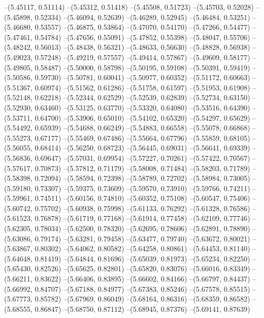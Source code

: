 --(5.45117, 0.51114)
--(5.45312, 0.51418)
--(5.45508, 0.51723)
--(5.45703, 0.52028)
--(5.45898, 0.52334)
--(5.46094, 0.52639)
--(5.46289, 0.52945)
--(5.46484, 0.53251)
--(5.46680, 0.53557)
--(5.46875, 0.53864)
--(5.47070, 0.54170)
--(5.47266, 0.54477)
--(5.47461, 0.54784)
--(5.47656, 0.55091)
--(5.47852, 0.55398)
--(5.48047, 0.55706)
--(5.48242, 0.56013)
--(5.48438, 0.56321)
--(5.48633, 0.56630)
--(5.48828, 0.56938)
--(5.49023, 0.57248)
--(5.49219, 0.57557)
--(5.49414, 0.57867)
--(5.49609, 0.58177)
--(5.49805, 0.58487)
--(5.50000, 0.58798)
--(5.50195, 0.59108)
--(5.50391, 0.59419)
--(5.50586, 0.59730)
--(5.50781, 0.60041)
--(5.50977, 0.60352)
--(5.51172, 0.60663)
--(5.51367, 0.60974)
--(5.51562, 0.61286)
--(5.51758, 0.61597)
--(5.51953, 0.61908)
--(5.52148, 0.62218)
--(5.52344, 0.62529)
--(5.52539, 0.62839)
--(5.52734, 0.63150)
--(5.52930, 0.63460)
--(5.53125, 0.63770)
--(5.53320, 0.64080)
--(5.53516, 0.64390)
--(5.53711, 0.64700)
--(5.53906, 0.65010)
--(5.54102, 0.65320)
--(5.54297, 0.65629)
--(5.54492, 0.65939)
--(5.54688, 0.66249)
--(5.54883, 0.66558)
--(5.55078, 0.66868)
--(5.55273, 0.67177)
--(5.55469, 0.67486)
--(5.55664, 0.67796)
--(5.55859, 0.68105)
--(5.56055, 0.68414)
--(5.56250, 0.68723)
--(5.56445, 0.69031)
--(5.56641, 0.69339)
--(5.56836, 0.69647)
--(5.57031, 0.69954)
--(5.57227, 0.70261)
--(5.57422, 0.70567)
--(5.57617, 0.70873)
--(5.57812, 0.71179)
--(5.58008, 0.71484)
--(5.58203, 0.71789)
--(5.58398, 0.72094)
--(5.58594, 0.72398)
--(5.58789, 0.72702)
--(5.58984, 0.73005)
--(5.59180, 0.73307)
--(5.59375, 0.73609)
--(5.59570, 0.73910)
--(5.59766, 0.74211)
--(5.59961, 0.74511)
--(5.60156, 0.74810)
--(5.60352, 0.75108)
--(5.60547, 0.75406)
--(5.60742, 0.75702)
--(5.60938, 0.75998)
--(5.61133, 0.76292)
--(5.61328, 0.76586)
--(5.61523, 0.76878)
--(5.61719, 0.77168)
--(5.61914, 0.77458)
--(5.62109, 0.77746)
--(5.62305, 0.78034)
--(5.62500, 0.78320)
--(5.62695, 0.78606)
--(5.62891, 0.78890)
--(5.63086, 0.79174)
--(5.63281, 0.79458)
--(5.63477, 0.79740)
--(5.63672, 0.80021)
--(5.63867, 0.80302)
--(5.64062, 0.80582)
--(5.64258, 0.80861)
--(5.64453, 0.81140)
--(5.64648, 0.81419)
--(5.64844, 0.81696)
--(5.65039, 0.81973)
--(5.65234, 0.82250)
--(5.65430, 0.82526)
--(5.65625, 0.82801)
--(5.65820, 0.83076)
--(5.66016, 0.83349)
--(5.66211, 0.83622)
--(5.66406, 0.83895)
--(5.66602, 0.84166)
--(5.66797, 0.84437)
--(5.66992, 0.84707)
--(5.67188, 0.84977)
--(5.67383, 0.85246)
--(5.67578, 0.85515)
--(5.67773, 0.85782)
--(5.67969, 0.86049)
--(5.68164, 0.86316)
--(5.68359, 0.86582)
--(5.68555, 0.86847)
--(5.68750, 0.87112)
--(5.68945, 0.87376)
--(5.69141, 0.87639)
